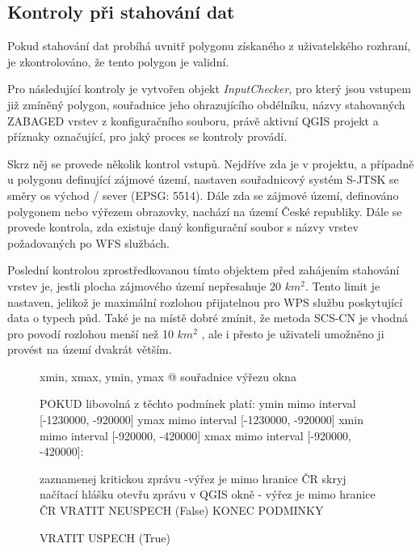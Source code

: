 \documentclass[a4paper,oneside,12pt]{book}
\begin{document}
\subsection{Kontroly při stahování dat} \label{download_checks}
\hspace{10mm} Pokud stahování dat probíhá uvnitř polygonu získaného z uživatelského rozhraní, je zkontrolováno, že tento polygon je validní.

\hspace{10mm} Pro následující kontroly je vytvořen objekt \textit{InputChecker}, pro který jsou vstupem již zmíněný polygon, souřadnice jeho ohrazujícího obdélníku, názvy stahovaných ZABAGED vrstev z konfiguračního souboru, právě aktivní QGIS projekt a příznaky označující, pro jaký proces se kontroly provádí.

\hspace{10mm} Skrz něj se provede několik kontrol vstupů. Nejdříve zda je v projektu, a případně u polygonu definující zájmové území, nastaven souřadnicový systém S-JTSK se směry os východ / sever (EPSG: 5514). Dále zda se zájmové území, definováno polygonem nebo výřezem obrazovky, nachází na území České republiky. Dále se provede kontrola,  zda existuje daný konfigurační soubor s názvy vrstev požadovaných po WFS službách. 

\hspace{10mm} Poslední kontrolou zprostředkovanou tímto objektem před zahájením stahování vrstev je, jestli plocha zájmového území nepřesahuje 20 $km^{2}$. Tento limit je nastaven, jelikož je maximální rozlohou přijatelnou pro WPS službu poskytující data o typech půd. Také je na místě dobré zmínit, že metoda SCS-CN je vhodná pro povodí rozlohou menší než 10 $km^{2}$ \cite{MNYDGwleJOjKdRUp}, ale i přesto je uživateli umožněno ji provést na území dvakrát větším.

\begin{figure}[H]
\begin{pseudocode}[style=mypseudocode, caption={Ukázka kontroly umístění zájmového území v ČR},label={kod:CR_check}]
    xmin, xmax, ymin, ymax @ souřadnice výřezu okna
    
    POKUD libovolná z těchto podmínek platí:
         ymin mimo interval [-1230000, -920000]  
         ymax mimo interval [-1230000, -920000]  
         xmin mimo interval [-920000, -420000]  
         xmax mimo interval [-920000, -420000]:
            
            zaznamenej kritickou zprávu -výřez je mimo hranice ČR
            skryj načítací hlášku
            otevřu zprávu v QGIS okně - výřez je mimo hranice ČR
            VRATIT NEUSPECH (False)
    KONEC PODMINKY
    
    VRATIT USPECH (True)
\end{pseudocode}
\end{figure}
\end{document}
